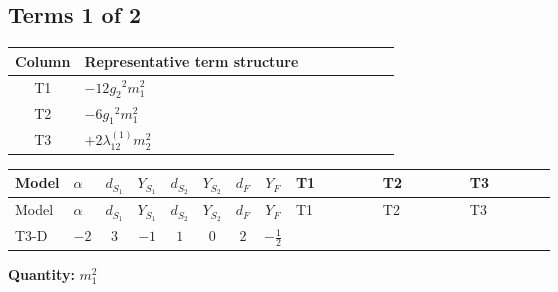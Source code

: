 \documentclass[8pt]{article}
\begin{document}
\begin{landscape}
\subsection*{Terms 1 of 2}
\begin{center}
\begin{tabular}{@{}c >{\raggedright\arraybackslash}p{0.82\linewidth}@{}}
\toprule
Column & Representative term structure \\
\midrule
T1 & \(\displaystyle -12 {g_2}^2 {m_1^2}\) \\
\midrule
T2 & \(\displaystyle -6 {g_1}^2 {m_1^2}\) \\
\midrule
T3 & \(\displaystyle +2 {\lambda_{12}^{(1)}} {m_2^2}\) \\
\midrule
\bottomrule
\end{tabular}
\end{center}
\smallskip
\tiny
\begin{longtable}{@{}llcccccc >{\raggedright\arraybackslash}p{0.21\linewidth} >{\raggedright\arraybackslash}p{0.21\linewidth} >{\raggedright\arraybackslash}p{0.21\linewidth}@{}}
\toprule
Model & $\alpha$ & $d_{S_1}$ & $Y_{S_1}$ & $d_{S_2}$ & $Y_{S_2}$ & $d_F$ & $Y_F$ & T1 & T2 & T3 \\
\midrule
\endfirsthead
\toprule
Model & $\alpha$ & $d_{S_1}$ & $Y_{S_1}$ & $d_{S_2}$ & $Y_{S_2}$ & $d_F$ & $Y_F$ & T1 & T2 & T3 \\
\midrule
\endhead
T3-D & $-2$ & $3$ & $-1$ & $1$ & $0$ & $2$ & $-\frac{1}{2}$ & \scriptsize\adjustbox{max width=\linewidth}{$\begin{gathered} -12 {g_2}^2 {m_1^2}\end{gathered}$} & \scriptsize\adjustbox{max width=\linewidth}{$\begin{gathered} -6 {g_1}^2 {m_1^2}\end{gathered}$} & \scriptsize\adjustbox{max width=\linewidth}{$\begin{gathered} +2 {\lambda_{12}^{(1)}} {m_2^2}\end{gathered}$} \\
\midrule
\bottomrule
\end{longtable}
\clearpage
\noindent\textbf{Quantity: }$m_1^2$\par\smallskip

\end{landscape}
\end{document}
